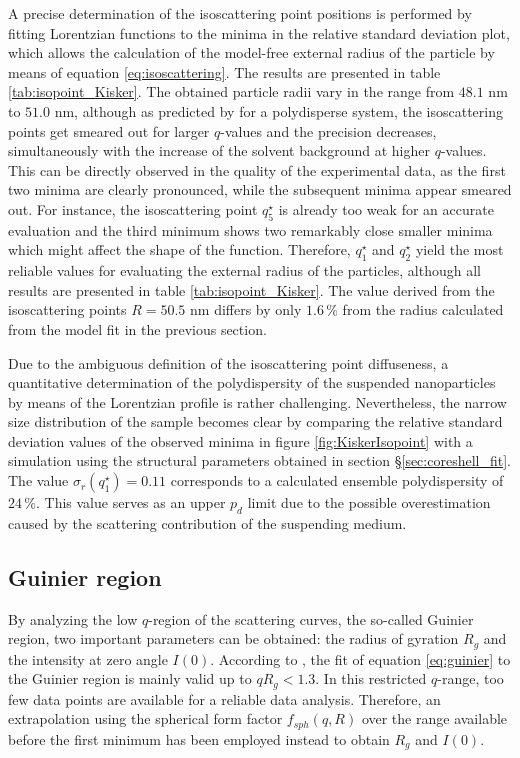 A precise determination of the isoscattering point positions is performed by fitting Lorentzian functions to the minima in the relative standard deviation plot, which allows the calculation of the model-free external radius of the particle by means of equation \eqref{eq:isoscattering}. The results are presented in table \ref{tab:isopoint_Kisker}. The obtained particle radii vary in the range from \(48.1\) nm to \(51.0\) nm, although as predicted by \cite{kawaguchi_isoscattering_1992-1} for a polydisperse system, the isoscattering points get smeared out for larger \( q \)-values and the precision decreases, simultaneously with the increase of the solvent background at higher \(q\)-values. This can be directly observed in the quality of the experimental data, as the first two minima are clearly pronounced, while the subsequent minima appear smeared out. For instance, the isoscattering point \(q^{\star}_5\) is already too weak for an accurate evaluation and the third minimum shows two remarkably close smaller minima which might affect the shape of the function. Therefore, \(q^{\star}_1\) and \(q^{\star}_2\) yield the most reliable values for evaluating the external radius of the particles, although all results are presented in table \ref{tab:isopoint_Kisker}. The value derived from the isoscattering points \(R=50.5\) nm differs by only \(1.6\,\%\) from the radius calculated from the model fit in the previous section.

Due to the ambiguous definition of the isoscattering point diffuseness, a quantitative determination of the polydispersity of the suspended nanoparticles by means of the Lorentzian profile is rather challenging. Nevertheless, the narrow size distribution of the sample becomes clear by comparing the relative standard deviation values of the observed minima in figure \ref{fig:KiskerIsopoint} with a simulation using the structural parameters obtained in section \S\ref{sec:coreshell_fit}. The value \( \sigma_r(q^{\star}_1)=0.11 \) corresponds to a calculated ensemble polydispersity of \(24\,\% \). This value serves as an upper \( p_d \) limit due to the possible overestimation caused by the scattering contribution of the suspending medium.


\subsection{Guinier region}
\label{sec:guinier_analysis}
By analyzing the low \(q \)-region of the scattering curves, the so-called Guinier region, two important parameters can be obtained: the radius of gyration \(R_g\) and the intensity at zero angle \(I(0)\). According to \cite{feigin_structure_1987}, the fit of equation \eqref{eq:guinier} to the Guinier region is mainly valid up to \( qR_g<1.3 \). In this restricted \(q\)-range, too few data points are available for a reliable data analysis. Therefore, an extrapolation using the spherical form factor \( f_{sph}(q,R) \) over the range available before the first minimum has been employed instead to obtain \(R_g\) and \(I(0)\).


